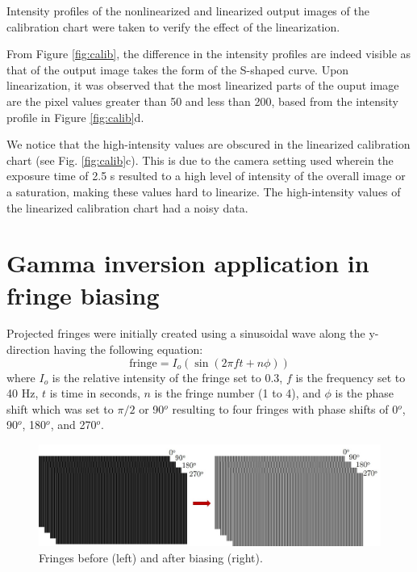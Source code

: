 Intensity profiles of the nonlinearized and linearized output images of the calibration chart were taken to verify the effect of the linearization. 

From Figure \ref{fig:calib}, the difference in the intensity profiles are indeed visible as that of the output image takes the form of the S-shaped curve. Upon linearization, it was observed that the most linearized parts of the ouput image are the pixel values greater than 50 and less than 200, based from the intensity profile in Figure \ref{fig:calib}d. 

We notice that the high-intensity values are obscured in the linearized calibration chart (see Fig. \ref{fig:calib}c). This is due to the camera setting used wherein the exposure time of 2.5 s resulted to a high level of intensity of the overall image or a saturation, making these values hard to linearize. The high-intensity values of the linearized calibration chart had a noisy data. 

\section{Gamma inversion application in fringe biasing}
Projected fringes were initially created using a sinusoidal wave along the y-direction having the following equation:
\begin{equation}
\textrm{fringe} = I_o(\sin(2\pi f t + n\phi))
\label{sine wave}
\end{equation}
where $I_o$ is the relative intensity of the fringe set to 0.3, $f$ is the frequency set to 40 Hz, $t$ is time in seconds, $n$ is the fringe number (1 to 4), and $\phi$ is the phase shift which was set to $\pi/2$ or 90$^o$ resulting to four fringes with phase shifts of 0$^o$, 90$^o$, 180$^o$, and 270$^o$.

\captionsetup[figure]{width=5in}
\begin{figure}[h!]
	\centering
	\includegraphics[width=1\textwidth]{figures/fringes.jpg}
	\caption{Fringes before (left) and after biasing (right).}
	\label{fig:fringes}
\end{figure}


